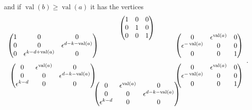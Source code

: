 \documentclass{amsart}
\theoremstyle{definition}
\def\e{\epsilon}
\def\val{\mathop{\mathrm{val}}}
\def\heximages#1#2#3#4#5#6{
  \heximagessqueezedcarefully{1.7em}{-1em}{#1}{#2}{#3}{#4}{#5}{#6}
}
\def\heximagessqueezedcarefully#1#2#3#4#5#6#7#8{
  \begin{array}{ccc}
    & #3 & \\[#2]
    #5 \hspace{-#1} & & \hspace{-#1} #4 \\[2em]
    #6 \hspace{-#1} & & \hspace{-#1} #7 \\[#2]
    & #8 &
  \end{array}
}
\begin{document}
  and if $\val(b) \ge \val(a)$ it has the vertices
  \begin{equation*}
    \heximages
        {
          \begin{pmatrix}
            1 & 0 & 0 \\ 
            0 & 1 & 0 \\
            0 & 0 & 1
          \end{pmatrix}
        }
        {
          \begin{pmatrix}
            0 & \e^{\val(a)} & 0 \\
            \e^{-\val(a)} & 0 & 0 \\
            0 & 0 & 1
          \end{pmatrix}
        }
        {
          \begin{pmatrix}
            1 & 0 & 0 \\
            0 & 0 & \e^{d - k - \val(a)} \\
            0 & \e^{k - d + \val(a)}  & 0
          \end{pmatrix} 
        }
        {
          \begin{pmatrix}
            0 & \e^{\val(a)} & 0 \\
            0 & 0 & \e^{d - k - \val(a)} \\
            \e^{k-d} & 0 & 0
           \end{pmatrix}
        }
        {
          \begin{pmatrix}
            0 & \e^{\val(a)} & 0 \\
            \e^{-\val(a)} & 0 & 0 \\
            0 & 0 & 1
          \end{pmatrix}
        }
        {
          \begin{pmatrix}
            0 & \e^{\val(a)} & 0 \\
            0 & 0 & \e^{d - k - \val(a)} \\
            \e^{k-d} & 0 & 0
          \end{pmatrix}
        }.
  \end{equation*}
\end{document}
